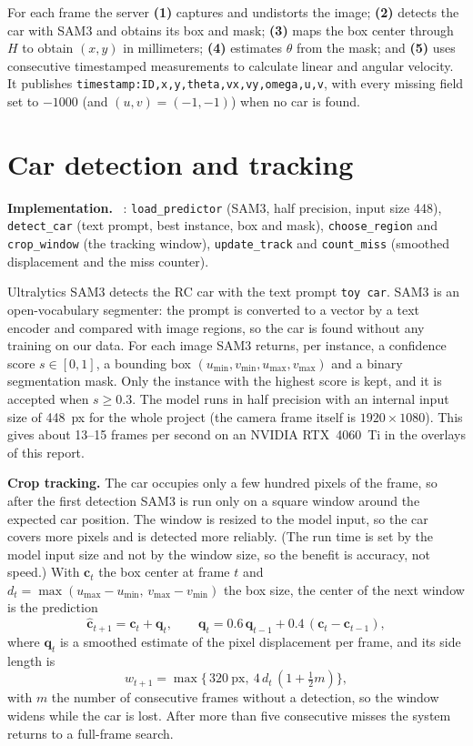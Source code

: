 \documentclass[10pt,a4paper]{article}
\newenvironment{impl}{\par\smallskip\noindent\footnotesize\textbf{Implementation.}\ }{\par\smallskip}
\begin{document}
For each frame the server \textbf{(1)} captures and undistorts the image;
\textbf{(2)} detects the car with SAM3 and obtains its box and mask;
\textbf{(3)} maps the box center through $H$ to obtain $(x,y)$ in
millimeters; \textbf{(4)} estimates $\theta$ from the mask; and
\textbf{(5)} uses consecutive timestamped measurements to calculate linear
and angular velocity.  It publishes
\texttt{timestamp:ID,x,y,theta,vx,vy,omega,u,v}, with every missing field set
to $-1000$ (and $(u,v)=(-1,-1)$) when no car is found.

\section{Car detection and tracking}
\label{sec:detect}

\begin{impl}
: \texttt{load\_predictor} (SAM3, half precision,
input size 448), \texttt{detect\_car} (text prompt, best instance, box and
mask), \texttt{choose\_region} and \texttt{crop\_window} (the tracking window),
\texttt{update\_track} and \texttt{count\_miss} (smoothed displacement and the
miss counter).
\end{impl}

Ultralytics SAM3 detects the RC car with the text prompt \texttt{toy car}.
SAM3 is an open-vocabulary segmenter: the prompt is converted to a vector by a
text encoder and compared with image regions, so the car is found without any
training on our data.  For each image SAM3 returns, per instance, a
confidence score $s\in[0,1]$, a bounding box
$(u_{\min},v_{\min},u_{\max},v_{\max})$ and a binary segmentation mask.  Only
the instance with the highest score is kept, and it is accepted when
$s\ge 0.3$.  The model runs in half precision with an internal input size of
448~px for the whole project (the camera frame itself is $1920\times1080$).
This gives about 13--15 frames per second on an NVIDIA RTX~4060~Ti in the
overlays of this report.

\textbf{Crop tracking.}  The car occupies only a few hundred pixels of the
frame, so after the first detection SAM3 is run only on a square window
around the expected car position.  The window is resized to the model input,
so the car covers more pixels and is detected more reliably.  (The run time
is set by the model input size and not by the window size, so the benefit is
accuracy, not speed.)  With $\mathbf c_t$ the box center at frame $t$ and
$d_t=\max(u_{\max}-u_{\min},\,v_{\max}-v_{\min})$ the box size, the center of
the next window is the prediction
\[
\hat{\mathbf c}_{t+1}=\mathbf c_t+\mathbf q_t,\qquad
\mathbf q_t=0.6\,\mathbf q_{t-1}+0.4\,(\mathbf c_t-\mathbf c_{t-1}),
\]
where $\mathbf q_t$ is a smoothed estimate of the pixel displacement per
frame, and its side length is
\[
w_{t+1}=\max\bigl\{\,320\ \text{px},\ 4\,d_t\,(1+\tfrac12 m)\bigr\},
\]
with $m$ the number of consecutive frames without a detection, so the window
widens while the car is lost.  After more than five consecutive misses the
system returns to a full-frame search.
\end{document}
